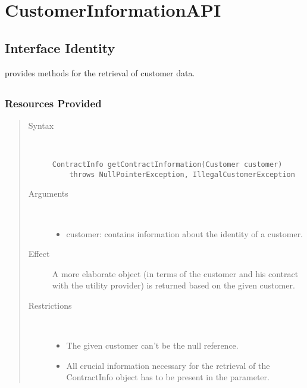 \section{CustomerInformationAPI}
\label{other-customer-information}

\subsection{Interface Identity}

\npar {} provides methods for the retrieval of
customer data.

\subsection{}

\subsubsection{Resources Provided}

\begin{quote}
	\begin{description}
		\item[Syntax] \
		\begin{verbatim}
ContractInfo getContractInformation(Customer customer)
    throws NullPointerException, IllegalCustomerException
		\end{verbatim}
		\item[Arguments] \
		\begin{itemize}
		  \item customer: contains information about the identity of a customer.
		\end{itemize}
		\item[Effect] A more elaborate object (in terms of the customer and his
		contract with the utility provider) is returned based on the given customer. 
		\item[Restrictions] \
		\begin{itemize}
		  \item The given customer can't be the null reference.
		  \item All crucial information necessary for the retrieval of the
		  ContractInfo object has to be present in the parameter.
		\end{itemize}
	\end{description} 
\end{quote}


